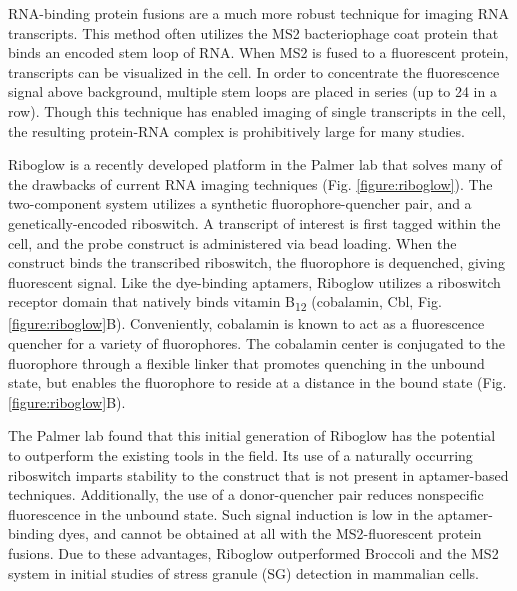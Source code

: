 RNA-binding protein fusions are a much more robust technique for imaging RNA transcripts\cite{FuscoSinglemRNAMolecules2003}. This method often utilizes the MS2 bacteriophage coat protein that binds an encoded stem loop of RNA. When MS2 is fused to a fluorescent protein, transcripts can be visualized in the cell. In order to concentrate the fluorescence signal above background, multiple stem loops are placed in series (up to 24 in a row). Though this technique has enabled imaging of single transcripts in the cell\cite{MorisakiRealtimequantificationsingle2016,FuscoSinglemRNAMolecules2003}, the resulting protein-RNA complex is prohibitively large for many studies.

Riboglow is a recently developed platform in the Palmer lab that solves many of the drawbacks of current RNA imaging techniques (Fig. \ref{figure:riboglow})\cite{BraselmannDevelopmentriboswitchbasedplatform2017}. The two-component system utilizes a synthetic fluorophore-quencher pair, and a genetically-encoded riboswitch. A transcript of interest is first tagged within the cell, and the probe construct is administered via bead loading\cite{McNeilGlassbeadsload1987,Hayashi-TakanakaTrackingepigenetichistone2011,MorisakiRealtimequantificationsingle2016}.
When the construct binds the transcribed riboswitch, the fluorophore is dequenched, giving fluorescent signal. Like the dye-binding aptamers, Riboglow utilizes a riboswitch receptor domain that natively binds vitamin B\textsubscript{12} (cobalamin, Cbl, Fig. \ref{figure:riboglow}B)\cite{JohnsonJrB12cofactorsdirectly2012}.
Conveniently, cobalamin is known to act as a fluorescence quencher for a variety of fluorophores\cite{RosendahlSynthesisbiologicalactivity1982,LeeDesignSynthesisCharacterization2009,SmeltzerSynthesisCharacterizationFluorescent2001}.
The cobalamin center is conjugated to the fluorophore through a flexible linker that promotes quenching in the unbound state, but enables the fluorophore to reside at a distance in the bound state (Fig. \ref{figure:riboglow}B).

The Palmer lab found that this initial generation of Riboglow has the potential to outperform the existing tools in the field. Its use of a naturally occurring riboswitch imparts stability to the construct that is not present in aptamer-based techniques. Additionally, the use of a donor-quencher pair reduces nonspecific fluorescence in the unbound state. Such signal induction is low in the aptamer-binding dyes, and cannot be obtained at all with the MS2-fluorescent protein fusions. Due to these advantages, Riboglow outperformed Broccoli and the MS2 system in initial studies of stress granule (SG) detection in mammalian cells.

